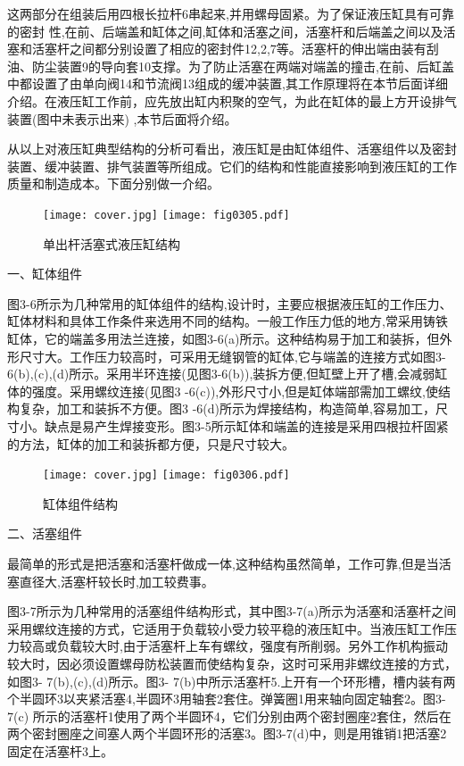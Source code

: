 

\noindent 这两部分在组装后用四根长拉杆6串起来,并用螺母固紧。为了保证液压缸具有可靠的密封
性,在前、后端盖和缸体之间,缸体和活塞之间，活塞杆和后端盖之间以及活塞和活塞杆之间都分别设置了相应的密封件12,2,7等。活塞杆的伸出端由装有刮油、防尘装置9的导向套10支撑。为了防止活塞在两端对端盖的撞击,在前、后缸盖中都设置了由单向阀14和节流阀13组成的缓冲装置,其工作原理将在本节后面详细介绍。在液压缸工作前，应先放出缸内积聚的空气，为此在缸体的最上方开设排气装置(图中未表示出来) ,本节后面将介绍。

\indent 从以上对液压缸典型结构的分析可看出，液压缸是由缸体组件、活塞组件以及密封装置、缓冲装置、排气装置等所组成。它们的结构和性能直接影响到液压缸的工作质量和制造成本。下面分别做一介绍。


\begin{figure}
\centering
\ifOpenSource
\texttt{[image: cover.jpg]}
\else
\texttt{[image: fig0305.pdf]}%
\fi
\caption{单出杆活塞式液压缸结构}
\label{fig:fig0305}%
\end{figure}

\indent 一、缸体组件

\indent 图3-6所示为几种常用的缸体组件的结构,设计时，主要应根据液压缸的工作压力、缸体材料和具体工作条件来选用不同的结构。一般工作压力低的地方,常采用铸铁缸体，它的端盖多用法兰连接，如图3-6(a)所示。这种结构易于加工和装拆，但外形尺寸大。工作压力较高时，可采用无缝钢管的缸体,它与端盖的连接方式如图3-6(b),(c),(d)所示。采用半环连接(见图3-6(b)),装拆方便,但缸壁上开了槽,会减弱缸体的强度。采用螺纹连接(见图3 -6(c)),外形尺寸小,但是缸体端部需加工螺纹,使结构复杂，加工和装拆不方便。图3 -6(d)所示为焊接结构，构造简单,容易加工，尺寸小。缺点是易产生焊接变形。图3-5所示缸体和端盖的连接是采用四根拉杆固紧的方法，缸体的加工和装拆都方便，只是尺寸较大。

\begin{figure}
\centering
\ifOpenSource
\texttt{[image: cover.jpg]}
\else
\texttt{[image: fig0306.pdf]}
\fi
\caption{缸体组件结构}
\label{fig:fig0306}
\end{figure}

\indent 二、活塞组件

\indent 最简单的形式是把活塞和活塞杆做成一体,这种结构虽然简单，工作可靠,但是当活塞直径大,活塞杆较长时,加工较费事。

\indent 图3-7所示为几种常用的活塞组件结构形式，其中图3-7(a)所示为活塞和活塞杆之间采用螺纹连接的方式，它适用于负载较小受力较平稳的液压缸中。当液压缸工作压力较高或负载较大时,由于活塞杆上车有螺纹，强度有所削弱。另外工作机构振动较大时，因必须设置螺母防松装置而使结构复杂，这时可采用非螺纹连接的方式，如图3- 7(b),(c),(d)所示。图3- 7(b)中所示活塞杆5.上开有一个环形槽，槽内装有两个半圆环3以夹紧活塞4,半圆环3用轴套2套住。弹簧圈1用来轴向固定轴套2。图3-7(c) 所示的活塞杆1使用了两个半圆环4，它们分别由两个密封圈座2套住，然后在两个密封圈座之间塞人两个半圆环形的活塞3。图3-7(d)中，则是用锥销1把活塞2固定在活塞杆3上。


